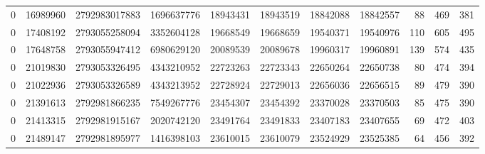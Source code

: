\begin{tabular}{rrrrrrrrrrr}
0 & 16989960 & 2792983017883 & 1696637776 & 18943431 & 18943519 & 18842088 & 18842557 & 88 & 469 & 381 \\
0 & 17408192 & 2793055258094 & 3352604128 & 19668549 & 19668659 & 19540371 & 19540976 & 110 & 605 & 495 \\
0 & 17648758 & 2793055947412 & 6980629120 & 20089539 & 20089678 & 19960317 & 19960891 & 139 & 574 & 435 \\
0 & 21019830 & 2793053326495 & 4343210952 & 22723263 & 22723343 & 22650264 & 22650738 & 80 & 474 & 394 \\
0 & 21022936 & 2793053326589 & 4343213952 & 22728924 & 22729013 & 22656036 & 22656515 & 89 & 479 & 390 \\
0 & 21391613 & 2792981866235 & 7549267776 & 23454307 & 23454392 & 23370028 & 23370503 & 85 & 475 & 390 \\
0 & 21413315 & 2792981915167 & 2020742120 & 23491764 & 23491833 & 23407183 & 23407655 & 69 & 472 & 403 \\
0 & 21489147 & 2792981895977 & 1416398103 & 23610015 & 23610079 & 23524929 & 23525385 & 64 & 456 & 392 \\
\bottomrule
\end{tabular}
